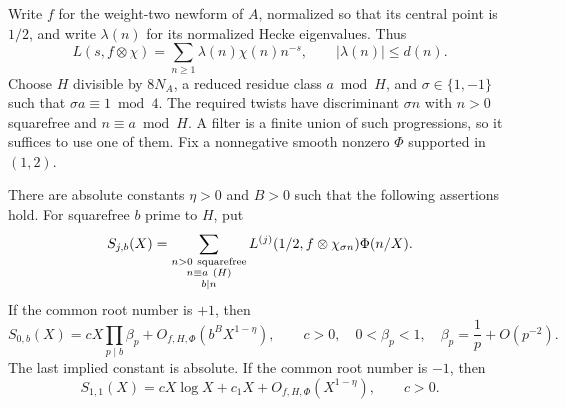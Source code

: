 Write $f$ for the weight-two newform of $A$, normalized so that its
central point is $1/2$, and write $\lambda(n)$ for its normalized Hecke
eigenvalues. Thus
\[
L(s,f\otimes\chi)=\sum_{n\ge1}\lambda(n)\chi(n)n^{-s},
\qquad |\lambda(n)|\le d(n).
\]
Choose $H$ divisible by $8N_A$, a reduced residue class $a\bmod H$, and
$\sigma\in\{1,-1\}$ such that $\sigma a\equiv1\bmod4$.
The required twists have discriminant $\sigma n$ with
$n>0$ squarefree and $n\equiv a\bmod H$. A filter is a finite union of
such progressions, so it suffices to use one of them. Fix a nonnegative
smooth nonzero $\Phi$ supported in $(1,2)$.

\begin{lemma}\label{nv:moment}
There are absolute constants $\eta>0$ and $B>0$ such that the
following assertions hold. For squarefree $b$ prime to $H$, put
\[
S_{j,b}(X)=
\sum_{\substack{n>0\ {\rm squarefree}\\ n\equiv a\ (H)\\b\mid n}}
 L^{(j)}(1/2,f\otimes\chi_{\sigma n})\Phi(n/X).
\]
If the common root number is $+1$, then
\[
S_{0,b}(X)=cX\prod_{p\mid b}\beta_p+
 O_{f,H,\Phi}(b^B X^{1-\eta}),
\qquad
c>0,\quad 0<\beta_p<1,\quad
\beta_p=\frac1p+O(p^{-2}).
\]
The last implied constant is absolute. If the common root number is
$-1$, then
\[
S_{1,1}(X)=cX\log X+c_1X+
 O_{f,H,\Phi}(X^{1-\eta}),\qquad c>0.
\]
\end{lemma}

